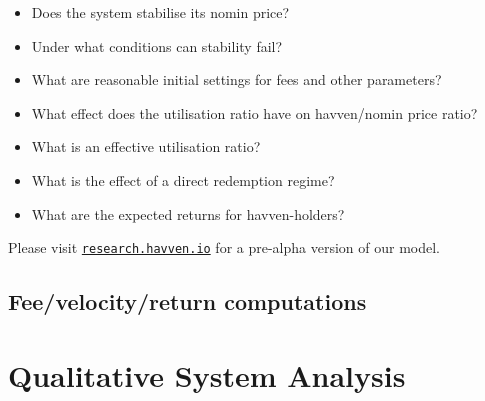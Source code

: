 \begin{itemize}
    \item Does the system stabilise its nomin price?
    \item Under what conditions can stability fail?
    \item What are reasonable initial settings for fees and other parameters?
    \item What effect does the utilisation ratio have on havven/nomin price ratio?
    \item What is an effective utilisation ratio?
    \item What is the effect of a direct redemption regime?
    \item What are the expected returns for havven-holders?
\end{itemize}






\noindent Please visit \href{http://research.havven.io}{\texttt{research.havven.io}} for a pre-alpha version of our model.

\subsection{Fee/velocity/return computations}

\pagebreak

\section{Qualitative System Analysis}

